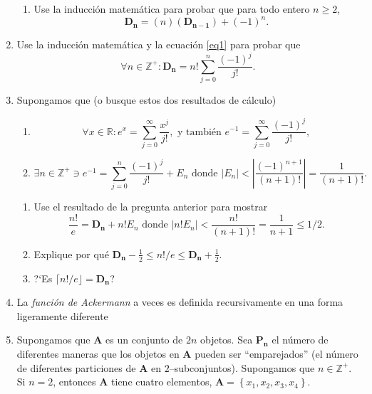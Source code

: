 \begin{enumerate}
\begin{enumerate}
				\item Use la inducción matemática para probar que para todo entero $n\geq 2$, \[ \bm{D_n}=(n)(\bm{D_{n-1}})+(-1)^n. \]
    \end{enumerate}
    \item Use la inducción matemática y la ecuación \eqref{eq1} para probar que \[ \forall n\in\mathds{Z}^{+}\colon\bm{D_n}=n!\sum_{j=0}^n\frac{(-1)^j}{j!}. \]
    \item Supongamos que (o busque estos dos resultados de cálculo)
    \begin{enumerate}
    	\item \[ \forall x\in\mathds{R}\colon e^x=\sum_{j=0}^\infty\frac{x^j}{j!},\text{ y también }e^{-1}=\sum_{j=0}^\infty\frac{(-1)^j}{j!}, \]
    	\item \[ \exists n\in\mathds{Z}^{+}\ni e^{-1}=\sum_{j=0}^n\frac{(-1)^j}{j!}+E_n \text{ donde }|E_n|<\left|\frac{(-1)^{n+1}}{(n+1)!}\right|=\frac{1}{(n+1)!}. \]
    \end{enumerate}
  
    \begin{enumerate}
        \item Use el resultado de la pregunta anterior para mostrar \[ \frac{n!}{e}=\bm{D_n}+n!E_n\text{ donde }|n!E_n|<\frac{n!}{(n+1)!}=\frac{1}{n+1}\leq 1/2. \]
        \item Explique por qué $\bm{D_n}-\tfrac{1}{2}\leq n!/e\leq\bm{D_n}+\tfrac{1}{2}$.
        \item ?`Es $\lceil n!/e\rfloor=\bm{D_n}$?%
    \end{enumerate}
    \item La \emph{función de Ackermann} a veces es definida recursivamente en una forma ligeramente diferente
    \item Supongamos que $\bm{A}$ es un conjunto de $2n$ objetos. Sea $\bm{P_n}$ el número de diferentes maneras que los objetos en $\bm{A}$ pueden ser ``emparejados'' (el número de diferentes particiones de $\bm{A}$ en $2$--subconjuntos). Supongamos que $n\in\mathds{Z}^{+}$. Si $n=2$, entonces $\bm{A}$ tiene cuatro elementos, $\bm{A}=\left\{x_1,x_2,x_3,x_4\right\}$.
    

\end{enumerate}
